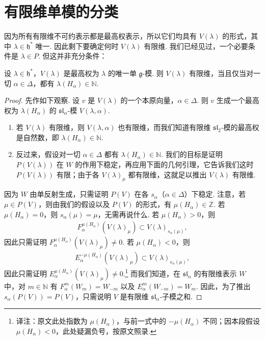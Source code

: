 \section{有限维单模的分类}\label{sec:ssl-4-2}
因为所有有限维不可约表示都是最高权表示，所以它们均具有 $V(\lambda)$ 的形式，其中 $\lambda\in\mathfrak h^*$ 唯一. 因此剩下要确定何时 $V(\lambda)$ 有限维. 我们已经见过，一个必要条件是 $\lambda\in P$. 但这并非充分条件：
\begin{theorem}\label{thm:ssl-4-2-1}
设 $\lambda\in\mathfrak h^*$，$V(\lambda)$ 是最高权为 $\lambda$ 的唯一单 $\mathfrak g$-模. 则 $V(\lambda)$ 有限维，当且仅当对一切 $\alpha\in\Delta$，都有 $\lambda(H_\alpha)\in\mathbb N$.
\end{theorem}
\begin{proof}
先作如下观察. 设 $v$ 是 $V(\lambda)$ 的一个本原向量，$\alpha\in\Delta$. 则 $v$ 生成一个最高权为 $\lambda(H_\alpha)$ 的 $\mathfrak{sl}_\alpha$-模 $V(\lambda,\alpha)$.
\begin{enumerate}[label=\roman*)]
\item 若 $V(\lambda)$ 有限维，则 $V(\lambda,\alpha)$ 也有限维，而我们知道有限维 $\mathfrak{sl}_2$-模的最高权是自然数，即 $\lambda(H_\alpha)\in\mathbb N$.
\item 反过来，假设对一切 $\alpha\in\Delta$ 都有 $\lambda(H_\alpha)\in\mathbb N$. 我们的目标是证明 $P(V(\lambda))$ 在 $W$ 的作用下稳定，再应用下面的几何引理，它告诉我们这时 $P(V(\lambda))$ 有限；由于各 $V(\lambda)_\mu$ 都有限维，这就足以推出 $V(\lambda)$ 有限维.
\end{enumerate}
因为 $W$ 由单反射生成，只需证明 $P(V)$ 在各 $s_\alpha$（$\alpha\in\Delta$）下稳定. 注意，若 $\mu\in P(V)$，则由我们的假设以及 $P(V)$ 的形式，有 $\mu(H_\alpha)\in\mathbb Z$. 若 $\mu(H_\alpha)=0$，则 $s_\alpha(\mu)=\mu$，无需再说什么. 若 $\mu(H_\alpha)>0$，则
\begin{align*}
F_\alpha^{\mu(H_\alpha)}(V(\lambda)_\mu)\subset V(\lambda)_{s_\alpha(\mu)},
\end{align*}
因此只需证明 $F_\alpha^{\mu(H_\alpha)}(V(\lambda)_\mu)\neq0$. 若 $\mu(H_\alpha)<0$，则
\begin{align*}
E_\alpha^{-\mu(H_\alpha)}(V(\lambda)_\mu)\subset V(\lambda)_{s_\alpha(\mu)},
\end{align*}
因此只需证明 $E_\alpha^{\mu(H_\alpha)}(V(\lambda)_\mu)\neq0$.\footnote{译注：原文此处指数为 $\mu(H_\alpha)$，与前一式中的 $-\mu(H_\alpha)$ 不同；因本段假设 $\mu(H_\alpha)<0$，此处疑漏负号，按原文照录.}
而我们知道，在 $\mathfrak{sl}_\alpha$ 的有限维表示 $W$ 中，对 $m\in\mathbb N$ 有 $F_\alpha^m(W_m)=W_{-m}$ 以及 $E_\alpha^m(W_{-m})=W_m$. 因此，为了推出 $s_\alpha(P(V))=P(V)$，只需说明 $V$ 是有限维 $\mathfrak{sl}_\alpha$-子模之和.

\end{proof}
